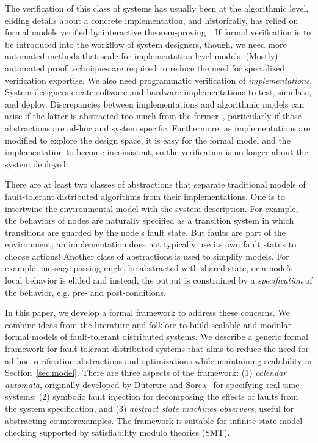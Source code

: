 \documentclass{llncs/llncs}
\begin{document}
The verification of this class of systems has usually been at the algorithmic level, eliding details about a concrete implementation, and historically, has relied on formal models verified by interactive theorem-proving~\cite{om-acl2-impl,Young97:IC,csl-93-2,pvs}. If formal verification is to be introduced into the workflow of system designers, though, we need more automated methods that scale for implementation-level models. (Mostly) automated proof techniques are required to reduce the need for specialized verification expertise. We also need programmatic verification of \emph{implementations}. System designers create software and hardware implementations to test, simulate, and deploy. Discrepancies between implementations and algorithmic models can arise if the latter is abstracted too much from the former~\cite{paxos}, particularly if those abstractions are ad-hoc and system specific. Furthermore, as implementations are modified to explore the design space, it is easy for the formal model and the implementation to become inconsistent, so the verification is no longer about the system deployed.

There are at least two classes of abstractions that separate traditional models of fault-tolerant distributed algorithms from their implementations.  One is to intertwine the environmental model with the system description. For example, the behaviors of nodes are naturally specified as a transition system in which transitions are guarded by the node's fault state. But faults are part of the environment; an implementation does not typically use its own fault status to choose actions! Another class of abstractions is used to simplify models.  For example, message passing might be abstracted with shared state, or a node's local behavior is elided and instead, the output is constrained by a \emph{specification} of the behavior, e.g. pre- and post-conditions.

In this paper, we develop a formal framework to address these concerns. We combine ideas from the literature and folklore to build scalable and modular formal models of fault-tolerant distributed systems. We describe a generic formal framework for fault-tolerant distributed systems that aims to reduce the need for ad-hoc verification abstractions and optimizations while maintaining scalability in Section~\ref{sec:model}. There are three aspects of the framework: (1) \emph{calendar automata}, originally developed by Dutertre and Sorea~\cite{cal} for specifying real-time systems; (2) symbolic fault injection for decomposing the effects of faults from the system specification, and (3) \emph{abstract state machines observers}, useful for abstracting counterexamples. The framework is suitable for infinite-state model-checking supported by satisfiability modulo theories (SMT).
\end{document}
